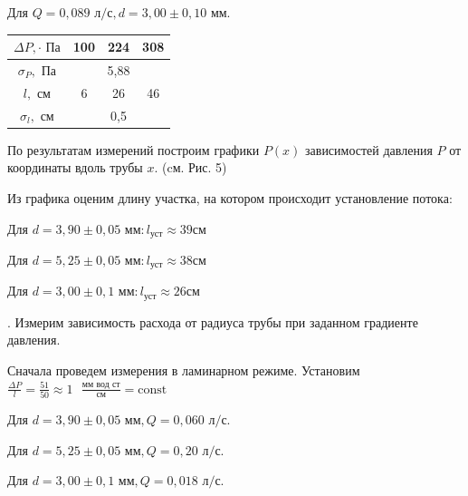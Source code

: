 \documentclass[a4paper,12pt]{article} %
\begin{document}
\medskip
\medskip

\noindent Для $Q = 0,089 \text{ л/с}, d = 3,00 \pm 0,10 \text{ мм}$.

\medskip
\medskip

\begin{tabular}{|c|c|c|c|}
\hline 
$ \Delta P, \cdot \text{ Па}$ & 100 & 224 & 308  \\ 
\hline 
$\sigma_P, \text{ Па}$ & \multicolumn{3}{c|}{5,88}\\
\hline
$ l, \text{ см}$ & 6 & 26 & 46 \\ 
\hline 
$\sigma_l, \text{ см}$ & \multicolumn{3}{c|}{0,5}\\
\hline
\end{tabular} 

\medskip
\medskip

\noindent По результатам измерений построим графики $P(x)$ зависимостей давления $P$ от координаты вдоль трубы $x$. (cм. Рис. 5)

\medskip

\noindent Из графика оценим длину участка, на котором происходит установление потока:

\medskip

\noindent Для $d = 3,90 \pm 0,05 \text{ мм}: l_\text{уст} \approx 39 \text{см}$

\medskip

\noindent Для $d = 5,25 \pm 0,05 \text{ мм}: l_\text{уст} \approx 38 \text{см}$

\medskip

\noindent Для $d = 3,00 \pm 0,1 \text{ мм}: l_\text{уст} \approx 26 \text{см}$

\medskip

. Измерим зависимость расхода от радиуса трубы при заданном градиенте
давления.

\medskip

\noindent Сначала проведем измерения в ламинарном режиме. Установим $\frac{\Delta P}{l} = \frac{51}{50} \approx 1 \text{ }\frac{\text{мм вод ст}}{\text{см}} = \text{const}$

\medskip

\noindent Для $d = 3,90 \pm 0,05 \text{ мм}, Q = 0,060 \text{ л/с}$.

\medskip
\medskip

\noindent Для $d = 5,25 \pm 0,05 \text{ мм}, Q = 0,20 \text{ л/с}$.

\medskip
\medskip

\noindent Для $d = 3,00 \pm 0,1 \text{ мм}, Q = 0,018 \text{ л/с}$.
\end{document}
